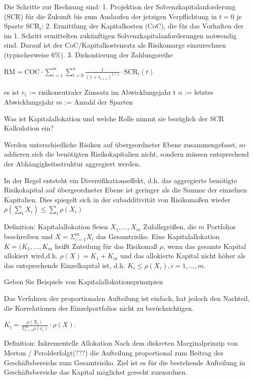 Die Schritte zur Rechnung sind:
1. Projektion der Solvenzkapitalanforderung (SCR) für die Zukunft bis zum Auslaufen
   der jetzigen Verpflichtung in \( t = 0 \) je Sparte \( \text{SCR}_i \):
2. Ermittlung der Kapitalkosten (CoC), die für das Vorhalten der im 1. Schritt ermittelten
   zukünftigen Solvenzkapitalanforderungen notwendig sind. Darauf ist der CoC/Kapitalkostensatz als Risikomarge
   einzurechnen (typischerweise 6\%).
3. Diskontierung der Zahlungsreihe

\( \text{RM} = \text{COC}\cdot \sum_{i=1}^m\sum_{t=0}^n \frac{1}{(1 + r_{t+1})^{t+1}}\cdot \text{SCR}_i(t) \)

es ist 
\(r_t\) := risikoneutraler Zinssatz im Abwicklungsjahr t
\( n \) := letztes Abwicklungsjahr
\( m \) := Anzahl der Sparten

Was ist Kapitalallokation und welche Rolle nimmt sie bezüglich der SCR Kalkulation ein?

Werden unterschiedliche Risiken auf übergeordneter Ebene zusammengefasst, so addieren sich die benötigten Risikokapitalien nicht, 
sondern müssen entsprechend der Abhängigkeitsstruktur aggregiert werden.

In der Regel entsteht ein Diversifikationseffekt, d.h. das aggregierte benötigte Risikokapital auf übergeordneter Ebene ist geringer 
als die Summe der einzelnen Kapitalien. Dies spiegelt sich in der subadditivität von Risikomaßen wieder
\( \rho(\sum_i X_i) \leq \sum_i \rho(X_i) \)


Definition: Kapitalallokation 
Seien \( X_{1}, ..., X_{m} \) Zufallsgrößen, die \( m \) Portfolios beschreiben und \( X = \Sigma_{i =1}^{m} X_{i} \) das Gesamtrisiko.
Eine Kapitalallokation \( K = (K_{1}, ..., K_{m} \) heißt Zuteilung für das Risikomaß \( \rho \), wenn das gesamte Kapital allokiert wird,d.h. 
\( \rho(X) = K_{1} + K_{m} \) und das allokierte Kapital nicht höher als das entsprechende Einzelkapital ist, d.h. 
\( K_{i} \leqslant \rho(X_{i}), i = 1, ..., m \).


Geben Sie Beispiele von Kapitalallokationsprinzipien


Das Verfahren der proportionalen Aufteilung ist einfach, hat jedoch den Nachteil, 
die Korrelationen der Einzelportfolios nicht zu berücksichtigen.

\( K_{i} = \frac{\rho(X_{i})}{\Sigma^{m}_{i = 1}\rho(x_{i})} \cdot \rho(X) \).


Definition: Inkrementelle Allokation
Nach dem diskreten Marginalprinzip von Merton / Perolderfolgt(???) die Aufteilung proportional zum Beitrag des Geschäftsbereichs zum Gesamtrisiko. 
Ziel ist es für die bestehende Aufteilung in Geschäftsbereiche das Kapital möglichst gerecht zuzuordnen.

